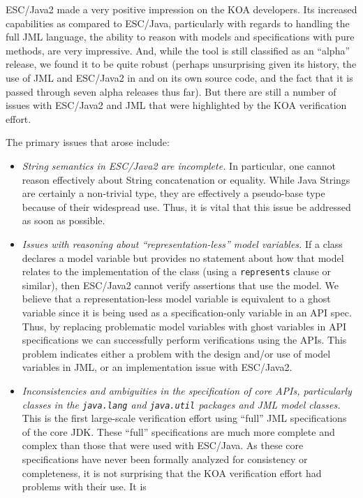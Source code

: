 \documentclass{llncs}
\begin{document}
ESC/Java2 made a very positive impression on the KOA developers.  Its
increased capabilities as compared to ESC/Java, particularly with
regards to handling the full JML language, the ability to reason with
models and specifications with pure methods, are very impressive.
And, while the tool is still classified as an ``alpha'' release, we
found it to be quite robust (perhaps unsurprising given its history,
the use of JML and ESC/Java2 in and on its own source code, and the
fact that it is passed through seven alpha releases thus far).  But
there are still a number of issues with ESC/Java2 and JML that were
highlighted by the KOA verification effort.

The primary issues that arose include:
\begin{itemize}
\item \emph{String semantics in ESC/Java2 are incomplete.}  In
  particular, one cannot reason effectively about String concatenation
  or equality.  While Java Strings are certainly a non-trivial type,
  they are effectively a pseudo-base type because of their widespread
  use.  Thus, it is vital that this issue be addressed as soon as
  possible.
\item \emph{Issues with reasoning about ``representation-less'' model
    variables.}  If a class declares a model variable but provides no
  statement about how that model relates to the implementation of the
  class (using a \texttt{represents} clause or similar), then
  ESC/Java2 cannot verify assertions that use the model.  We believe
  that a representation-less model variable is equivalent to a ghost
  variable since it is being used as a specification-only variable in
  an API spec.  Thus, by replacing problematic model variables with
  ghost variables in API specifications we can successfully perform
  verifications using the APIs.  This problem indicates either a
  problem with the design and/or use of model variables in JML, or an
  implementation issue with ESC/Java2.
\item \emph{Inconsistencies and ambiguities in the specification of
    core APIs, particularly classes in the \texttt{java.lang} and
    \texttt{java.util} packages and JML model classes.}  This is the
  first large-scale verification effort using ``full'' JML
  specifications of the core JDK.  These ``full'' specifications are
  much more complete and complex than those that were used with
  ESC/Java.  As these core specifications have never been formally
  analyzed for consistency or completeness, it is not surprising that
  the KOA verification effort had problems with their use.  It is

\end{itemize}
\end{document}
